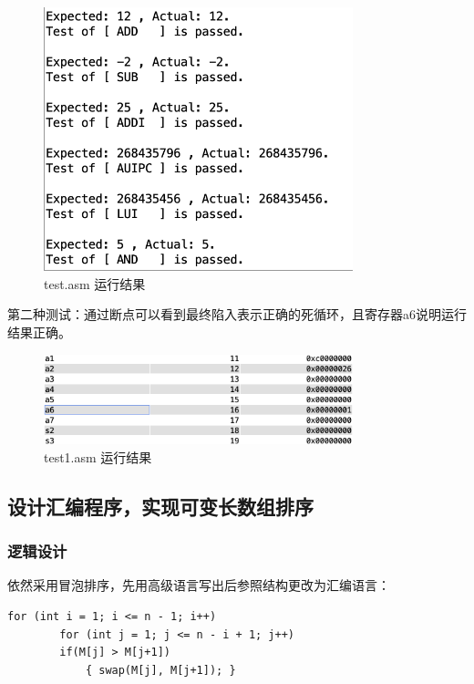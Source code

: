 \documentclass[a4paper]{article}
\begin{document}
\begin{figure}[H]
    \centering
    \includegraphics[width=0.8\textwidth]{test.png}
    \caption{test.asm 运行结果}
    \label{fig:test}
  \end{figure}

第二种测试：通过断点可以看到最终陷入表示正确的死循环，且寄存器a6说明运行结果正确。
\begin{figure}[H]
    \centering
    \includegraphics[width=0.8\textwidth]{test1.png}
    \caption{test1.asm 运行结果}
    \label{fig:test1}
  \end{figure}

\subsection{设计汇编程序，实现可变长数组排序}
\subsubsection{逻辑设计}
依然采用冒泡排序，先用高级语言写出后参照结构更改为汇编语言：
\begin{lstlisting}[language={[ANSI]c},title={sort.c}]
    for (int i = 1; i <= n - 1; i++)
        for (int j = 1; j <= n - i + 1; j++)
        if(M[j] > M[j+1]) 
            { swap(M[j], M[j+1]); }
\end{lstlisting}
\end{document}
